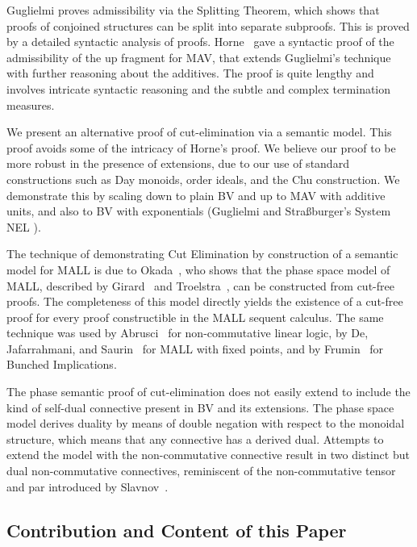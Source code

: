 Guglielmi \cite[\S4.1]{Guglielmi14:di} proves admissibility via the Splitting Theorem, which shows that proofs of conjoined structures can be split into separate subproofs. This is proved by a detailed syntactic analysis of proofs. Horne~\cite{Horne15:mav} gave a syntactic proof of the admissibility of the up fragment for MAV, that extends Guglielmi's technique with further reasoning about the additives. The proof is quite lengthy and involves intricate syntactic reasoning and the subtle and complex termination measures.

We present an alternative proof of cut-elimination via a semantic model. This proof avoids some of the intricacy of Horne's proof. We believe our proof to be more robust in the presence of extensions, due to our use of standard constructions such as Day monoids, order ideals, and the Chu construction. We demonstrate this by scaling down to plain BV and up to MAV with additive units, and also to BV with exponentials (Guglielmi and Stra{\ss}burger's System NEL \cite{Burger_2011,GuglielmiS11}).

The technique of demonstrating Cut Elimination by construction of a semantic model for MALL is due to Okada~\cite{Okada99:psc}, who shows that the phase space model of MALL, described by Girard~\cite[\S4.1]{Girard87:ll} and Troelstra~\cite[]{Troelstra92:lll}, can be constructed from cut-free proofs.
The completeness of this model directly yields the existence of a cut-free proof for every proof constructible in the MALL sequent calculus.
The same technique was used by Abrusci~\cite{Abrusci91:psc} for non-commutative linear logic, by De, Jafarrahmani, and Saurin~\cite{De22:psc} for MALL with fixed points, and by Frumin~\cite{Frumin22:psc} for Bunched Implications.

The phase semantic proof of cut-elimination does not easily extend to include the kind of self-dual connective present in BV and its extensions.
The phase space model derives duality by means of double negation with respect to the monoidal structure, which means that any connective has a derived dual. Attempts to extend the model with the non-commutative connective result in two distinct but dual non-commutative connectives, reminiscent of the non-commutative tensor and par introduced by Slavnov~\cite{Slavnov19:scmll}.

\subsection{Contribution and Content of this Paper}

